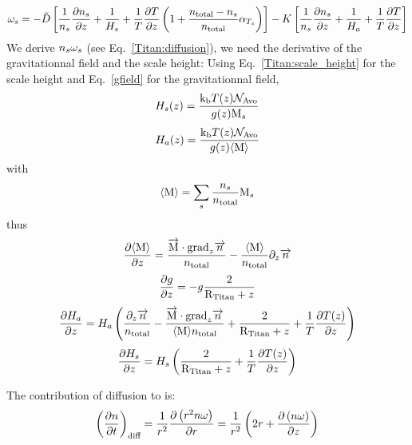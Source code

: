 \begin{equation}
\omega_s = -\tilde{D} 
                \left[
                      \frac{1}{n_s}\frac{\partial n_s}{\partial z} + \frac{1}{H_s} + 
                      \frac{1}{T}\frac{\partial T}{\partial z}\left(1 + \frac{n_\text{total} - n_s}{n_\text{total}}\alpha_{T_s}\right)
                \right] 
           - K 
                \left[
                     \frac{1}{n_s}\frac{\partial n_s}{\partial z} + \frac{1}{H_a} + \frac{1}{T}\frac{\partial T}{\partial z}
                \right]
\label{Titan:omega_diff}
\end{equation}
We derive $n_s\omega_s$ (see Eq.~\ref{Titan:diffusion}),
we need the derivative of the gravitationnal field and the scale height:
Using Eq.~\ref{Titan:scale_height} for the scale height and Eq.~\ref{gfield}
for the gravitationnal field,
\begin{equation}
H_s(z) = \frac{\text{k}_\text{b} T(z) \mathcal{N}_\text{Avo}}{g(z)\text{M}_s}
\label{Titan:scale_height_spec}
\end{equation}
\begin{equation}
H_a(z) = \frac{\text{k}_\text{b} T(z) \mathcal{N}_\text{Avo}}{g(z)\langle\text{M}\rangle}
\label{Titan:scale_height_atm}
\end{equation}
with
\begin{equation}
\langle\text{M}\rangle = \sum_s \frac{n_s}{n_\text{total}} \text{M}_s
\end{equation}
thus
\begin{equation}
\frac{\partial\langle\text{M}\rangle}{\partial z} =   \frac{\overrightarrow{\text{M}}\cdot\text{grad}_{z}\overrightarrow{n}}{n_\text{total}}
                        - \frac{\langle\text{M}\rangle}{n_\text{total}}\partial_{z}{\overrightarrow{n}}
\end{equation}
\begin{equation}
\frac{\partial g}{\partial z} = -   g \frac{2}{\text{R}_\text{Titan} + z}
\end{equation}
\begin{equation}
\frac{\partial H_a}{\partial z} = H_a \left(\frac{\partial_{z}{\overrightarrow{n}}}{n_\text{total}}
                                - \frac{\overrightarrow{\text{M}}\cdot\text{grad}_{z}\overrightarrow{n}}{\langle\text{M}\rangle n_\text{total}}
                                + \frac{2}{\text{R}_\text{Titan} + z} 
                                + \frac{1}{T}\frac{\partial T(z)}{\partial z}\right)
\end{equation}
\begin{equation}
\frac{\partial H_s}{\partial z} = H_s\left(\frac{2}{\text{R}_\text{Titan} + z} + \frac{1}{T}\frac{\partial T(z)}{\partial z}\right) 
\end{equation}

The contribution of diffusion to  is:
\begin{equation}
\left(\frac{\partial n}{\partial t}\right)_{\text{diff}} = \frac{1}{r^2}\frac{\partial\left(r^2n\omega\right)}{\partial r}
                                             = \frac{1}{r^2}\left(2 r + \frac{\partial\left(n\omega\right)}{\partial z}\right)
\label{Titan:diffusion}
\end{equation}

